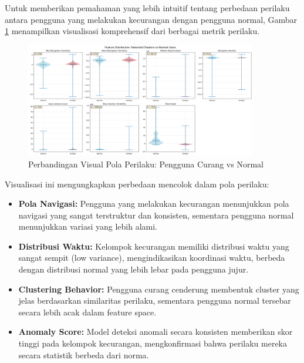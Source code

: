 Untuk memberikan pemahaman yang lebih intuitif tentang perbedaan perilaku antara pengguna yang melakukan kecurangan dengan pengguna normal, Gambar \ref{fig:cheater_normal_comparison} menampilkan visualisasi komprehensif dari berbagai metrik perilaku.

\begin{figure}[htbp]
    \centering
    \includegraphics[width=0.9\textwidth]{figures/cheater_vs_normal_comparison.png}
    \caption{Perbandingan Visual Pola Perilaku: Pengguna Curang vs Normal}
    \label{fig:cheater_normal_comparison}
\end{figure}

Visualisasi ini mengungkapkan perbedaan mencolok dalam pola perilaku:

\begin{itemize}
    \item \textbf{Pola Navigasi:} Pengguna yang melakukan kecurangan menunjukkan pola navigasi yang sangat terstruktur dan konsisten, sementara pengguna normal menunjukkan variasi yang lebih alami.
    
    \item \textbf{Distribusi Waktu:} Kelompok kecurangan memiliki distribusi waktu yang sangat sempit (low variance), mengindikasikan koordinasi waktu, berbeda dengan distribusi normal yang lebih lebar pada pengguna jujur.
    
    \item \textbf{Clustering Behavior:} Pengguna curang cenderung membentuk cluster yang jelas berdasarkan similaritas perilaku, sementara pengguna normal tersebar secara lebih acak dalam feature space.
    
    \item \textbf{Anomaly Score:} Model deteksi anomali secara konsisten memberikan skor tinggi pada kelompok kecurangan, mengkonfirmasi bahwa perilaku mereka secara statistik berbeda dari norma.
\end{itemize}

